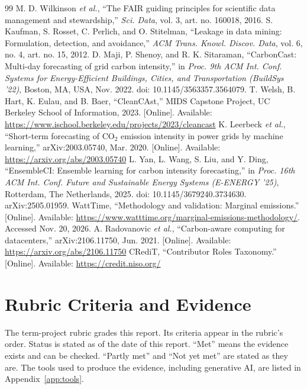 \documentclass[10pt,journal,compsoc]{IEEEtran}
\begin{document}
\begin{thebibliography}{99}
 M. D. Wilkinson \emph{et al.}, ``The FAIR guiding principles for scientific data management and stewardship,'' \emph{Sci. Data}, vol. 3, art. no. 160018, 2016.
 S. Kaufman, S. Rosset, C. Perlich, and O. Stitelman, ``Leakage in data mining: Formulation, detection, and avoidance,'' \emph{ACM Trans. Knowl. Discov. Data}, vol. 6, no. 4, art. no. 15, 2012.
 D. Maji, P. Shenoy, and R. K. Sitaraman, ``CarbonCast: Multi-day forecasting of grid carbon intensity,'' in \emph{Proc. 9th ACM Int. Conf. Systems for Energy-Efficient Buildings, Cities, and Transportation (BuildSys '22)}, Boston, MA, USA, Nov. 2022. doi: 10.1145/3563357.3564079.
 T. Welsh, B. Hart, K. Eulau, and B. Baer, ``CleanCAst,'' MIDS Capstone Project, UC Berkeley School of Information, 2023. [Online]. Available: \url{https://www.ischool.berkeley.edu/projects/2023/cleancast}
 K. Leerbeck \emph{et al.}, ``Short-term forecasting of CO$_2$ emission intensity in power grids by machine learning,'' arXiv:2003.05740, Mar. 2020. [Online]. Available: \url{https://arxiv.org/abs/2003.05740}
 L. Yan, L. Wang, S. Liu, and Y. Ding, ``EnsembleCI: Ensemble learning for carbon intensity forecasting,'' in \emph{Proc. 16th ACM Int. Conf. Future and Sustainable Energy Systems (E-ENERGY '25)}, Rotterdam, The Netherlands, 2025. doi: 10.1145/3679240.3734630. arXiv:2505.01959.
 WattTime, ``Methodology and validation: Marginal emissions.'' [Online]. Available: \url{https://www.watttime.org/marginal-emissions-methodology/}. Accessed Nov. 20, 2026.
 A. Radovanovic \emph{et al.}, ``Carbon-aware computing for datacenters,'' arXiv:2106.11750, Jun. 2021. [Online]. Available: \url{https://arxiv.org/abs/2106.11750}
 CRediT, ``Contributor Roles Taxonomy.'' [Online]. Available: \url{https://credit.niso.org/}
\end{thebibliography}

\appendices

\section{Rubric Criteria and Evidence}
\label{app:rubric}

The term-project rubric grades this report. Its criteria appear in the rubric's order. Status is stated as of the date of this report. ``Met'' means the evidence exists and can be checked. ``Partly met'' and ``Not yet met'' are stated as they are. The tools used to produce the evidence, including generative AI, are listed in Appendix~\ref{app:tools}.
\end{document}
